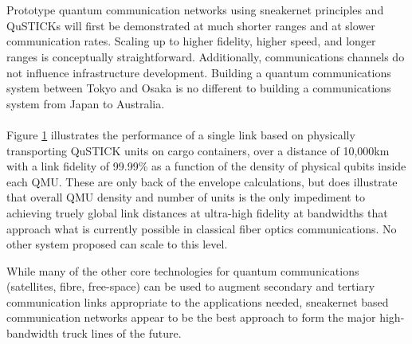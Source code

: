 \documentclass[aps,prl,twocolumn,10pt,nofootinbib]{revtex4}
\begin{document}
\\
\\
Prototype quantum communication networks using sneakernet principles and QuSTICKs will first be demonstrated at much shorter ranges and at slower communication rates.  Scaling up to higher fidelity, higher speed, and longer ranges is conceptually straightforward.  Additionally, communications channels do not influence infrastructure development.  Building a quantum communications system between Tokyo and Osaka is no different to building a communications system from Japan to Australia. 
\\
\\
Figure \ref{fig:link} illustrates the performance of a single link based on physically transporting QuSTICK units on cargo containers, over a distance of 10,000km with a link fidelity of 99.99\% as a function of the density of physical qubits inside each QMU.  These are only back of the envelope calculations, but does illustrate that overall QMU density and number of units is the only impediment to achieving truely global link distances at ultra-high fidelity at bandwidths that approach what is currently possible in classical fiber optics communications.  No other system proposed can scale to this level.  
\begin{figure}[ht!]
	\caption{}
	\label{fig:link}
\end{figure}
While many of the other core technologies for quantum communications (satellites, fibre, free-space) can be used to augment secondary and tertiary communication links appropriate to the applications needed, sneakernet based communication networks appear to be the best approach to form the major high-bandwidth truck lines of the future.  



\end{document}
